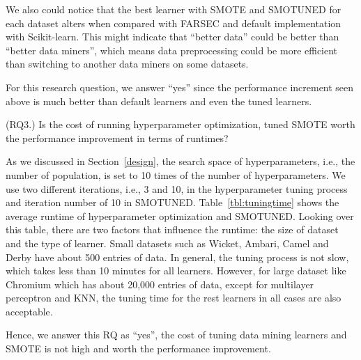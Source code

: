 We also could notice that the best learner with SMOTE and SMOTUNED for each dataset alters when compared with FARSEC and default implementation with Scikit-learn. This might indicate that ``better data'' could be better than ``better data miners'', which means data preprocessing could be more efficient than switching to another data miners on some datasets.

For this research question, we answer ``yes'' since the performance increment seen above is much better than default learners and even the tuned learners.

\begin{tcolorbox}[enhanced,width=3.4in,size=fbox,
    fontupper=\normalsize\bfseries,drop shadow southwest,sharp corners]
(RQ3.) Is the cost of running hyperparameter optimization, tuned SMOTE worth the performance improvement in terms of runtimes?
\end{tcolorbox}

As we discussed in Section~\ref{design}, the search space of hyperparameters, i.e., the number of population, is set to 10 times of the number of hyperparameters. We use two different iterations, i.e., 3 and 10, in the hyperparameter tuning process and iteration number of 10 in SMOTUNED. Table~\ref{tbl:tuningtime} shows the average runtime of hyperparameter optimization and SMOTUNED. Looking over this table, there are two factors that influence the runtime: the size of dataset and the type of learner. Small datasets such as Wicket, Ambari, Camel and Derby have about 500 entries of data. In general, the tuning process is not slow, which takes less than 10 minutes for all learners. However, for large dataset like Chromium which has about 20,000 entries of data, except for multilayer perceptron and KNN, the tuning time for the rest learners in all cases are also acceptable.

Hence, we answer this RQ as ``yes'', the cost of tuning data mining learners and SMOTE is not high and worth the performance improvement.

